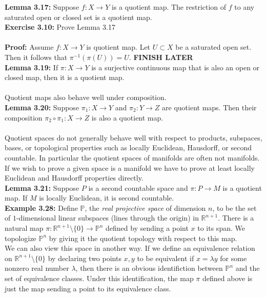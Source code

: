 \documentclass{article}
\begin{document}
  \textbf{Lemma 3.17:} Suppose $f:X\to Y$ is a quotient map. The restriction of $f$ to any saturated open or closed set is a quotient map.\\
  \textbf{Exercise 3.10:} Prove Lemma 3.17\\
  \\
  \textbf{Proof:} Assume $f:X\to Y$ is quotient map. Let $U\subset X$ be a saturated open set. Then it follows that $\pi^{-1}(\pi(U)) = U$. \textbf{FINISH LATER}\\
  \textbf{Lemma 3.19:} If $\pi:X\to Y$ is a surjective continuous map that is also an open or closed map, then it is a quotient map.\\
  \\
  Quotient maps also behave well under composition.\\
  \textbf{Lemma 3.20:} Suppose $\pi_1:X\to Y$ and $\pi_2:Y\to Z$ are quotient maps. Then their composition $\pi_2\circ \pi_1:X\to Z$ is also a quotient map.\\
  \\
  Quotient spaces do not generally behave well with respect to products, subspaces, bases, or topological properties such as locally Euclidean, Hausdorff, or second countable. In particular the quotient spaces of manifolds are often not manifolds.\\
  If we wish to prove a given space is a manifold we have to prove at least locally Euclidean and Hausdorff properties directly.\\

  \textbf{Lemma 3.21:} Suppose $P$ is a second countable space and $\pi: P\to M$ is a quotient map. If $M$ is locally Euclidean, it is second countable.\\

  \textbf{Example 3.28:} Define \(\mathbb{P}\), the \textit{real projective space} of dimension \(n\), to be the set of \(1\)-dimensional linear subspaces (lines through the origin) in \(\mathbb{R}^{n+1}\). There is a natural map \(\pi:\mathbb{R}^{n+1}\setminus\{0\}\to \mathbb{P}^n\) defined by sending a point \(x\) to its span. We topologize \(\mathbb{P}^n\) by giving it the quotient topology with respect to this map.\\
  We can also view this space in another way. If we define an equivalence relation on \(\mathbb{R}^{n+1}\setminus\{0\}\) by declaring two points \(x,y\) to be equivalent if \(x=\lambda y\) for some nonzero real number \(\lambda\), then there is an obvious identifiction between \(\mathbb{P}^n\) and the set of equivalence classes. Under this identification, the map \(\pi\) defined above is just the map sending a point to its equivalence class.
\end{document}
